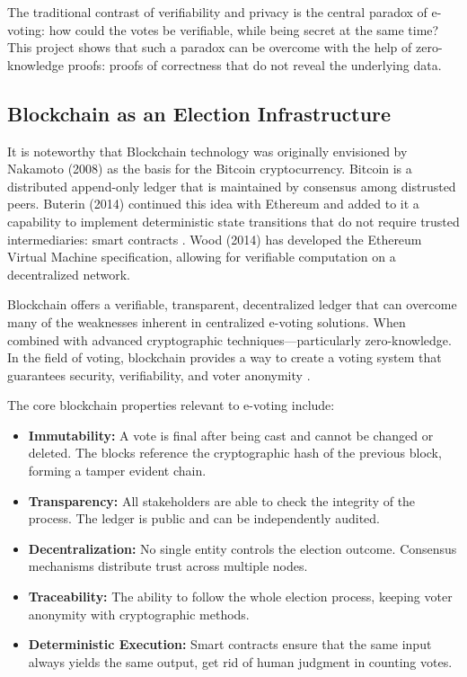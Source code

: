 \documentclass[12pt, a4paper]{report}
\begin{document}
The traditional contrast of verifiability and privacy is the central paradox of e-voting: how could the votes be verifiable, while being secret at the same time? This project shows that such a paradox can be overcome with the help of zero-knowledge proofs: proofs of correctness that do not reveal the underlying data.

\subsection{Blockchain as an Election Infrastructure}

It is noteworthy that Blockchain technology was originally envisioned by Nakamoto (2008) \cite{nakamoto2008bitcoin} as the basis for the Bitcoin cryptocurrency. Bitcoin is a distributed append-only ledger that is maintained by consensus among distrusted peers. Buterin (2014) \cite{buterin2014ethereum}continued this idea with Ethereum and added to it a capability to implement deterministic state transitions that do not require trusted intermediaries: smart contracts \cite{szabo1997smart}. Wood (2014) \cite{wood2014ethereum} has developed the Ethereum Virtual Machine specification, allowing for verifiable computation on a decentralized network.

Blockchain offers a verifiable, transparent, decentralized ledger that can overcome many of the weaknesses inherent in centralized e-voting solutions. When combined with advanced cryptographic techniques—particularly zero-knowledge. In the field of voting, blockchain provides a way to create a voting system that guarantees security, verifiability, and voter anonymity \cite{mdpi2024evoting, cluster2024blockchain}.

The core blockchain properties relevant to e-voting include:
\begin{itemize}
    \item \textbf{Immutability:} A vote is final after being cast and cannot be changed or deleted. The blocks reference the cryptographic hash of the previous block, forming a tamper evident chain.
    \item \textbf{Transparency:} All stakeholders are able to check the integrity of the process. The ledger is public and can be independently audited.
    \item \textbf{Decentralization:} No single entity controls the election outcome. Consensus mechanisms distribute trust across multiple nodes.
    \item \textbf{Traceability:} The ability to follow the whole election process, keeping voter anonymity with cryptographic methods.
    \item \textbf{Deterministic Execution:} Smart contracts ensure that the same input always yields the same output, get rid of human judgment in counting votes.
\end{itemize}
\end{document}

